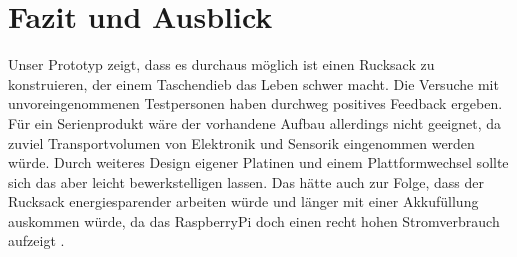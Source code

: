 \documentclass{sigchi}
\begin{document}
\section{Fazit und Ausblick}
Unser Prototyp zeigt, dass es durchaus möglich ist einen Rucksack zu
konstruieren, der einem Taschendieb das Leben schwer macht. Die Versuche
mit unvoreingenommenen Testpersonen haben durchweg positives Feedback
ergeben. Für ein Serienprodukt wäre der vorhandene Aufbau allerdings
nicht geeignet, da zuviel Transportvolumen von Elektronik und Sensorik
eingenommen werden würde. Durch weiteres Design eigener Platinen und einem 
Plattformwechsel sollte sich das aber leicht bewerkstelligen lassen.
Das hätte auch zur Folge, dass der Rucksack energiesparender arbeiten
würde und länger mit einer Akkufüllung auskommen würde, da das
RaspberryPi doch einen recht hohen Stromverbrauch aufzeigt \cite{Heise:RpiPower}.


\balance{}



\end{document}
